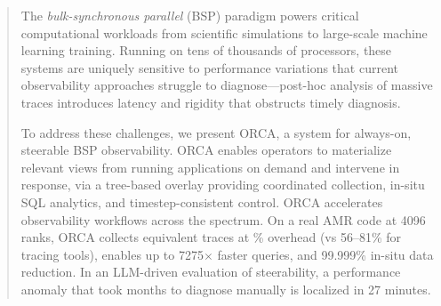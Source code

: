 \begin{abstract}
  The \emph{bulk-synchronous parallel} (BSP) paradigm powers critical computational workloads from
  scientific simulations to large-scale machine learning training.
  Running on tens of thousands of processors, these systems are uniquely sensitive to performance
  variations that current observability approaches struggle to diagnose---post-hoc analysis of
  massive traces introduces latency and rigidity that obstructs timely diagnosis.

  To address these challenges, we present ORCA, a system for always-on, steerable BSP observability.
  ORCA enables operators to materialize relevant views from running applications on demand and
  intervene in response, via a tree-based overlay providing coordinated collection, in-situ SQL
  analytics, and timestep-consistent control.
  ORCA accelerates observability workflows across the spectrum.
  On a real AMR code at 4096 ranks, ORCA collects equivalent traces at \% overhead (vs
  56–81\% for tracing tools), enables up to 7275$\times$ faster queries, and 99.999\% in-situ data reduction.
  In an LLM-driven evaluation of steerability, a performance anomaly that took months to
  diagnose manually is localized in 27 minutes.

\end{abstract}
